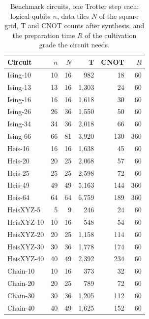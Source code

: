 \begin{table}[t]
  \centering
  \caption{Benchmark circuits, one Trotter step each: logical qubits $n$, data tiles $N$ of
    the square grid, T and CNOT counts after synthesis, and the preparation time $R$ of the
    cultivation grade the circuit needs.}
  \label{tab:benchmarks}
  \begin{tabular}{lrrrrr}
    \toprule
    Circuit & $n$ & $N$ & T & CNOT & $R$ \\
    \midrule
    Ising-10   & 10 & 16 &    982 &  18 &  60 \\
    Ising-13   & 13 & 16 &  1,303 &  24 &  60 \\
    Ising-16   & 16 & 16 &  1,618 &  30 &  60 \\
    Ising-26   & 26 & 36 &  1,550 &  50 &  60 \\
    Ising-34   & 34 & 36 &  2,018 &  66 &  60 \\
    Ising-66   & 66 & 81 &  3,920 & 130 & 360 \\
    Heis-16    & 16 & 16 &  1,638 &  45 &  60 \\
    Heis-20    & 20 & 25 &  2,068 &  57 &  60 \\
    Heis-25    & 25 & 25 &  2,598 &  72 &  60 \\
    Heis-49    & 49 & 49 &  5,163 & 144 & 360 \\
    Heis-64    & 64 & 64 &  6,759 & 189 & 360 \\
    \midrule
    HeisXYZ-5  &  5 &  9 &    246 &  24 &  60 \\
    HeisXYZ-10 & 10 & 16 &    548 &  54 &  60 \\
    HeisXYZ-20 & 20 & 25 &  1,158 & 114 &  60 \\
    HeisXYZ-30 & 30 & 36 &  1,778 & 174 &  60 \\
    HeisXYZ-40 & 40 & 49 &  2,392 & 234 &  60 \\
    Chain-10   & 10 & 16 &    373 &  32 &  60 \\
    Chain-20   & 20 & 25 &    789 &  72 &  60 \\
    Chain-30   & 30 & 36 &  1,205 & 112 &  60 \\
    Chain-40   & 40 & 49 &  1,625 & 152 &  60 \\

\end{tabular}
\end{table}
